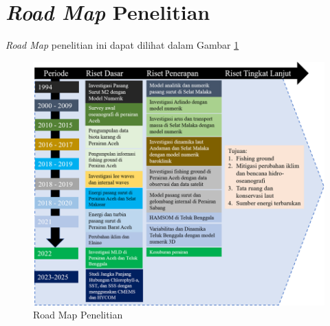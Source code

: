 \section[\textit{Road Map }Penelitian]{\textit{Road Map} Penelitian}
\begin{spacing}{1.5}
	\textit{Road Map} penelitian ini dapat dilihat dalam Gambar \ref{fig:RM}
	\begin{figure}[H]
		\centering
		\includegraphics[width=12cm]{contents/Figures/Road_Map}
		\caption{Road Map Penelitian}
		\label{fig:RM}
	\end{figure}
	
\end{spacing}